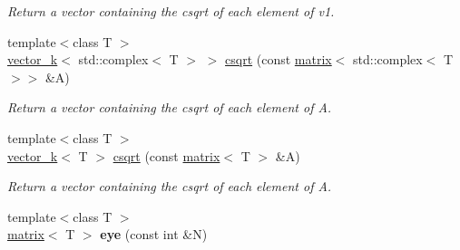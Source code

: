 \begin{DoxyCompactItemize}
\begin{DoxyCompactList}\small\item\em Return a vector containing the csqrt of each element of v1. \end{DoxyCompactList}\item 
\hypertarget{namespacekeycpp_af8482452959bd0ad0cee0e5704ae7851}{{\footnotesize template$<$class T $>$ }\\\hyperlink{classkeycpp_1_1vector__k}{vector\-\_\-k}$<$ std\-::complex$<$ T $>$ $>$ \hyperlink{namespacekeycpp_af8482452959bd0ad0cee0e5704ae7851}{csqrt} (const \hyperlink{classkeycpp_1_1matrix}{matrix}$<$ std\-::complex$<$ T $>$$>$ \&A)}\label{namespacekeycpp_af8482452959bd0ad0cee0e5704ae7851}

\begin{DoxyCompactList}\small\item\em Return a vector containing the csqrt of each element of A. \end{DoxyCompactList}\item 
\hypertarget{namespacekeycpp_a6bc00b1e07523727e7ae0e20ec1cf834}{{\footnotesize template$<$class T $>$ }\\\hyperlink{classkeycpp_1_1vector__k}{vector\-\_\-k}$<$ T $>$ \hyperlink{namespacekeycpp_a6bc00b1e07523727e7ae0e20ec1cf834}{csqrt} (const \hyperlink{classkeycpp_1_1matrix}{matrix}$<$ T $>$ \&A)}\label{namespacekeycpp_a6bc00b1e07523727e7ae0e20ec1cf834}

\begin{DoxyCompactList}\small\item\em Return a vector containing the csqrt of each element of A. \end{DoxyCompactList}\item 
\hypertarget{namespacekeycpp_a8ae33fb19a521ab1ec1f22e7c39ca076}{{\footnotesize template$<$class T $>$ }\\\hyperlink{classkeycpp_1_1matrix}{matrix}$<$ T $>$ {\bfseries eye} (const int \&N)}\label{namespacekeycpp_a8ae33fb19a521ab1ec1f22e7c39ca076}


\end{DoxyCompactItemize}
